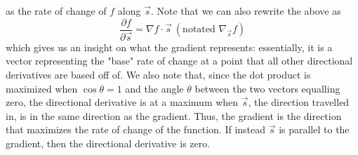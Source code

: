 \documentclass{article}
\begin{document}
 as the rate of change of $f$ along $\vec{s}$. Note that we can also rewrite the above as 
 \begin{equation*}
    \frac{\partial f}{\partial \vec{s}} = \nabla f \cdot \vec{s} \ (\text{notated }\nabla_{\vec{s}} f)
 \end{equation*}
 which gives us an insight on what the gradient represents: essentially, it is a vector representing the "base" rate of change at a point that all other directional derivatives are based off of. We also note that, since the dot product is maximized when $\cos \theta = 1$ and the angle $\theta$ between the two vectors equalling zero, the directional derivative is at a maximum when $\vec{s}$, the direction travelled in, is in the same direction as the gradient. Thus, the gradient is the direction that maximizes the rate of change of the function. If instead $\vec{s}$ is parallel to the gradient, then the directional derivative is zero. 
\end{document}
